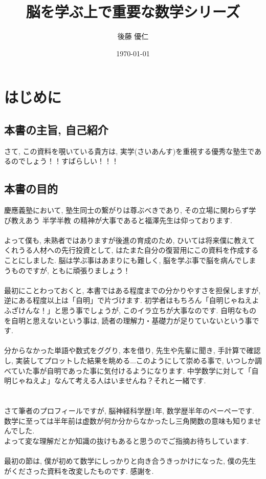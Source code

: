 \documentclass[11pt,a4paper]{jsarticle}
\title{脳を学ぶ上で重要な数学シリーズ}
\author{後藤 優仁}
\date{\today}
\begin{document}
\maketitle
%
%
\tableofcontents

\section{はじめに}
\subsection{本書の主旨, 自己紹介}
さて, この資料を覗いている貴方は, 実学(さいあんす)を重視する優秀な塾生であるのでしょう！！すばらしい！！！\\

\subsection{本書の目的}
慶應義塾において, 塾生同士の繋がりは尊ぶべきであり, その立場に関わらず学び教えあう 半学半教 の精神が大事であると福澤先生は仰っております. \\
\\
よって僕も, 未熟者ではありますが後進の育成のため, ひいては将来僕に教えてくれうる人材への先行投資として, はたまた自分の復習用にこの資料を作成することにしました. 脳は学ぶ事はあまりにも難しく, 脳を学ぶ事で脳を病んでしまうものですが, ともに頑張りましょう！ \\
\\
最初にことわっておくと, 本書ではある程度までの分かりやすさを担保しますが, 逆にある程度以上は「自明」で片づけます. 初学者はもちろん「自明じゃねえよふざけんな！」と思う事でしょうが, このイラ立ちが大事なのです. 自明なものを自明と思えないという事は, 読者の理解力・基礎力が足りていないという事です. \\\\
分からなかった単語や数式をググり, 本を借り, 先生や先輩に聞き, 手計算で確認し, 実装してプロットした結果を眺める...このようにして崇める事で, いつしか調べていた事が自明であった事に気付けるようになります. 中学数学に対して「自明じゃねえよ」なんて考える人はいませんね？それと一緒です.\\
\\
\\
さて筆者のプロフィールですが, 脳神経科学歴1年, 数学歴半年のペーペーです. 数学に至っては半年前は虚数が何か分からなかったし三角関数の意味も知りませんでした.\\
よって変な理解だとか知識の抜けもあると思うのでご指摘お待ちしています.\\
\\
最初の節は, 僕が初めて数学にしっかりと向き合うきっかけになった, 僕の先生がくださった資料を改変したものです. 感謝を.\\
\end{document}

